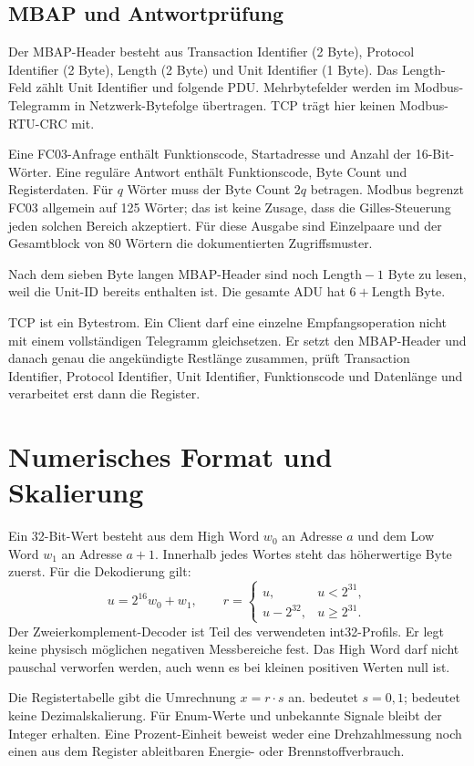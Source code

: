 \documentclass[10pt,a4paper]{article}
\begin{document}
\subsection{MBAP und Antwortprüfung}
Der MBAP-Header besteht aus Transaction Identifier (2 Byte), Protocol Identifier (2 Byte), Length (2 Byte) und Unit Identifier (1 Byte). Das Length-Feld zählt Unit Identifier und folgende PDU. Mehrbytefelder werden im Modbus-Telegramm in Netzwerk-Bytefolge übertragen. TCP trägt hier keinen Modbus-RTU-CRC mit.

Eine FC03-Anfrage enthält Funktionscode, Startadresse und Anzahl der 16-Bit-Wörter. Eine reguläre Antwort enthält Funktionscode, Byte Count und Registerdaten. Für $q$ Wörter muss der Byte Count $2q$ betragen. Modbus begrenzt FC03 allgemein auf 125 Wörter; das ist keine Zusage, dass die Gilles-Steuerung jeden solchen Bereich akzeptiert. Für diese Ausgabe sind Einzelpaare und der Gesamtblock von 80 Wörtern die dokumentierten Zugriffsmuster.

Nach dem sieben Byte langen MBAP-Header sind noch $\mathrm{Length}-1$ Byte zu lesen, weil die Unit-ID bereits enthalten ist. Die gesamte ADU hat $6+\mathrm{Length}$ Byte.

TCP ist ein Bytestrom. Ein Client darf eine einzelne Empfangsoperation nicht mit einem vollständigen Telegramm gleichsetzen. Er setzt den MBAP-Header und danach genau die angekündigte Restlänge zusammen, prüft Transaction Identifier, Protocol Identifier, Unit Identifier, Funktionscode und Datenlänge und verarbeitet erst dann die Register.

\section{Numerisches Format und Skalierung}
\label{sec:format}
Ein 32-Bit-Wert besteht aus dem High Word $w_0$ an Adresse $a$ und dem Low Word $w_1$ an Adresse $a+1$. Innerhalb jedes Wortes steht das höherwertige Byte zuerst. Für die Dekodierung gilt:
\[
 u=2^{16}w_0+w_1,\qquad
 r=\begin{cases}u,&u<2^{31},\\u-2^{32},&u\geq2^{31}.\end{cases}
\]
Der Zweierkomplement-Decoder ist Teil des verwendeten int32-Profils. Er legt keine physisch möglichen negativen Messbereiche fest. Das High Word darf nicht pauschal verworfen werden, auch wenn es bei kleinen positiven Werten null ist.

Die Registertabelle gibt die Umrechnung $x=r\cdot s$ an.  bedeutet $s=0{,}1$;  bedeutet keine Dezimalskalierung. Für Enum-Werte und unbekannte Signale bleibt der Integer erhalten. Eine Prozent-Einheit beweist weder eine Drehzahlmessung noch einen aus dem Register ableitbaren Energie- oder Brennstoffverbrauch.
\end{document}
